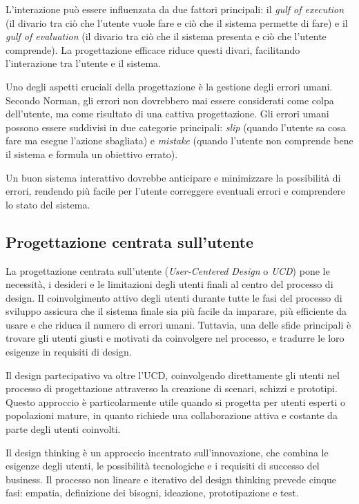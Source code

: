 L'interazione può essere influenzata da due fattori principali: il \textit{gulf of execution} (il divario tra ciò che l'utente vuole fare e ciò che il sistema permette di fare) e il \textit{gulf of evaluation} (il divario tra ciò che il sistema presenta e ciò che l'utente comprende). La progettazione efficace riduce questi divari, facilitando l'interazione tra l'utente e il sistema.

Uno degli aspetti cruciali della progettazione è la gestione degli errori umani. Secondo Norman, gli errori non dovrebbero mai essere considerati come colpa dell'utente, ma come risultato di una cattiva progettazione. Gli errori umani possono essere suddivisi in due categorie principali: \textit{slip} (quando l’utente sa cosa fare ma esegue l’azione sbagliata) e \textit{mistake} (quando l’utente non comprende bene il sistema e formula un obiettivo errato).

Un buon sistema interattivo dovrebbe anticipare e minimizzare la possibilità di errori, rendendo più facile per l'utente correggere eventuali errori e comprendere lo stato del sistema.

\subsection{Progettazione centrata sull’utente}
La progettazione centrata sull’utente (\textit{User-Centered Design} o \textit{UCD}) pone le necessità, i desideri e le limitazioni degli utenti finali al centro del processo di design. Il coinvolgimento attivo degli utenti durante tutte le fasi del processo di sviluppo assicura che il sistema finale sia più facile da imparare, più efficiente da usare e che riduca il numero di errori umani. Tuttavia, una delle sfide principali è trovare gli utenti giusti e motivati da coinvolgere nel processo, e tradurre le loro esigenze in requisiti di design.

Il design partecipativo va oltre l'UCD, coinvolgendo direttamente gli utenti nel processo di progettazione attraverso la creazione di scenari, schizzi e prototipi. Questo approccio è particolarmente utile quando si progetta per utenti esperti o popolazioni mature, in quanto richiede una collaborazione attiva e costante da parte degli utenti coinvolti.

Il design thinking è un approccio incentrato sull'innovazione, che combina le esigenze degli utenti, le possibilità tecnologiche e i requisiti di successo del business. Il processo non lineare e iterativo del design thinking prevede cinque fasi: empatia, definizione dei bisogni, ideazione, prototipazione e test.

